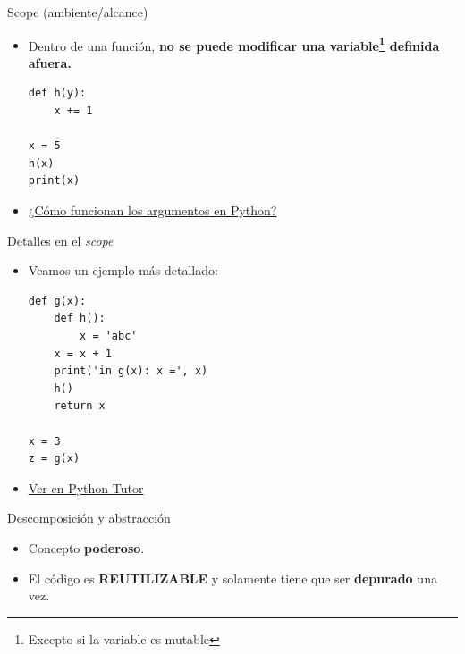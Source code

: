 \documentclass[mathserif]{beamer}
\begin{document}
\begin{frame}[fragile]{Scope (ambiente/alcance)}
    \begin{itemize}
        \item Dentro de una función, {\blue\bfseries no se puede modificar una variable\footnote{Excepto si la variable es mutable} definida afuera.}
\begin{lstlisting}
def h(y):
    x += 1

x = 5
h(x)
print(x)
\end{lstlisting}
    
    \item \href{https://www.python-course.eu/python3_passing_arguments.php}{¿Cómo funcionan los argumentos en Python?}
    
    \end{itemize}
\end{frame}

\begin{frame}[fragile]{Detalles en el \textit{scope}}
    \begin{itemize}
        \item Veamos un ejemplo más detallado: 
\begin{lstlisting}
def g(x):
    def h():
        x = 'abc'
    x = x + 1
    print('in g(x): x =', x)
    h()
    return x

x = 3
z = g(x)
\end{lstlisting}
        
        \item \href{http://www.pythontutor.com/visualize.html#code=def%20g(x%29%3A%0A%20%20%20%20def%20h(%29%3A%0A%20%20%20%20%20%20%20%20x%20%3D%20'abc'%0A%20%20%20%20x%20%3D%20x%20%2B%201%0A%20%20%20%20print('in%20g(x%29%3A%20x%20%3D',%20x%29%0A%20%20%20%20h(%29%0A%20%20%20%20return%20x%0A%0Ax%20%3D%203%0Az%20%3D%20g(x%29&cumulative=false&curInstr=0&heapPrimitives=false&mode=display&origin=opt-frontend.js&py=3&rawInputLstJSON=%5B%5D&textReferences=false}{Ver en Python Tutor}
    \end{itemize}
\end{frame}


\begin{frame}[fragile]{Descomposición y abstracción}
    \begin{itemize}
        \item Concepto {\blue\bfseries poderoso}.
        
        \item El código es {\blue\bfseries REUTILIZABLE} y solamente tiene que ser {\orange\bfseries depurado} una vez.
    \end{itemize}
\end{frame}
\end{document}
